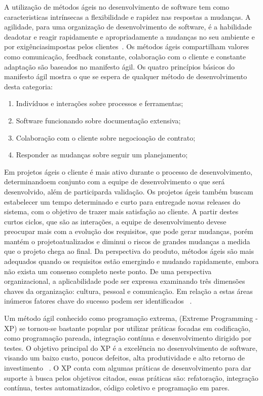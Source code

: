 A utilização de métodos ágeis no desenvolvimento de software tem como caracteristicas 
intrínsecas a flexibilidade e rapidez nas respostas a mudanças. 
%
A agilidade, para uma organização de desenvolvimento de software, é a habilidade 
deadotar e reagir rapidamente e apropriadamente a mudanças no seu ambiente e por 
exigênciasimpostas pelos clientes~\cite{nerur2005}.
%
Os métodos ágeis compartilham valores como comunicação, feedback constante, colaboração 
com o cliente e constante adaptação são baseados no manifesto ágil. Os quatro princípios 
básicos do manifesto ágil mostra o que se espera de qualquer método de desenvolvimento 
desta categoria:
%
\begin{enumerate}
\item Indivíduos  e interações sobre processos e ferramentas;
\item Software funcionando sobre documentação extensiva;
\item Colaboração com o cliente sobre negocioação de contrato;
\item Responder as  mudanças sobre seguir um planejamento;
\end{enumerate}
%
Em projetos ágeis o cliente é mais ativo durante o processo de desenvolvimento, 
determinandoem conjunto com a equipe de desenvolvimento o que será desenvolvido, 
além de participarda validação. Os projetos ágeis também buscam estabelecer um 
tempo determinado e curto para entregade novas releases do sistema, com o objetivo 
de trazer mais satisfação ao cliente.
%
A partir destes curtos ciclos, que são as interações, a equipe de desenvolvimento 
devese preocupar mais com a evolução dos requisitos, que pode gerar mudanças, porém 
mantém o projetoatualizados e diminui o riscos de grandes mudanças a medida que o 
projeto chega ao final.
%
Da perspectiva do produto, métodos ágeis são mais adequados quando os requisitos 
estão emergindo e mudando rapidamente, embora não exista um consenso completo 
neste ponto. De uma perspectiva organizacional, a aplicabilidade pode ser expressa 
examinando três dimensões chaves da organização: cultura, pessoal e comunicação. 
Em relação a estas áreas inúmeros fatores chave do sucesso podem ser identificados 
~\cite{cohen2004}.

Um método ágil conhecido como programação extrema, (Extreme Programming - XP) se 
tornou-se bastante popular por utilizar práticas focadas em codificação, como 
programação pareada, integração contínua e desenvolvimento dirigido por testes.
%
O objetivo principal do XP é a excelência no desenvolvimento de software, visando 
um baixo custo, poucos defeitos, alta produtividade e alto retorno de investimento
~\cite{sato2007}.
O XP conta com algumas práticas de desenvolvimento para dar suporte à busca pelos 
objetivos citados, essas práticas são: refatoração, integração contínua, testes 
automatizados, código coletivo e programação em pares.

